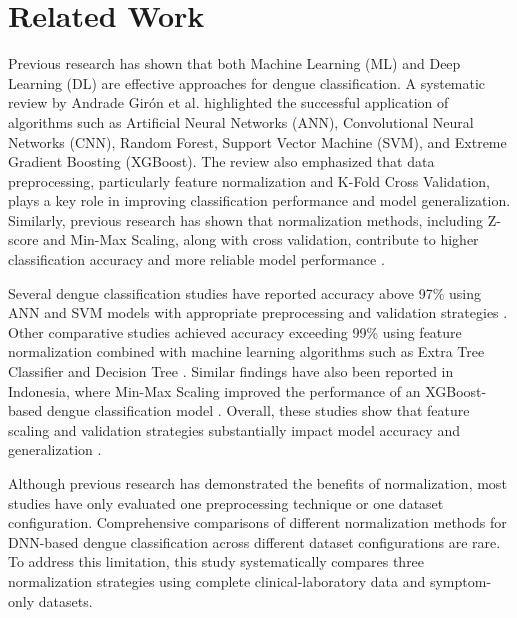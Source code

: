 \documentclass[conference]{IEEEtran}
\begin{document}

\section{Related Work}

Previous research has shown that both Machine Learning (ML) and Deep Learning (DL) are effective approaches for dengue classification. A systematic review by Andrade Girón et al. \cite{b12} highlighted the successful application of algorithms such as Artificial Neural Networks (ANN), Convolutional Neural Networks (CNN), Random Forest, Support Vector Machine (SVM), and Extreme Gradient Boosting (XGBoost). The review also emphasized that data preprocessing, particularly feature normalization and K-Fold Cross Validation, plays a key role in improving classification performance and model generalization. Similarly, previous research has shown that normalization methods, including Z-score and Min-Max Scaling, along with cross validation, contribute to higher classification accuracy and more reliable model performance \cite{b13,b17,b18,b20,b22}.

Several dengue classification studies have reported accuracy above 97\% using ANN and SVM models with appropriate preprocessing and validation strategies \cite{b14,b15,b16,b19}. Other comparative studies achieved accuracy exceeding 99\% using feature normalization combined with machine learning algorithms such as Extra Tree Classifier and Decision Tree \cite{b3,b24}. Similar findings have also been reported in Indonesia, where Min-Max Scaling improved the performance of an XGBoost-based dengue classification model \cite{b5}. Overall, these studies show that feature scaling and validation strategies substantially impact model accuracy and generalization \cite{b21}.

Although previous research has demonstrated the benefits of normalization, most studies have only evaluated one preprocessing technique or one dataset configuration. Comprehensive comparisons of different normalization methods for DNN-based dengue classification across different dataset configurations are rare. To address this limitation, this study systematically compares three normalization strategies using complete clinical-laboratory data and symptom-only datasets.

\end{document}
